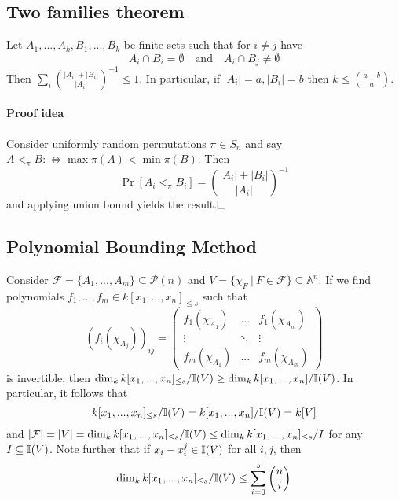\subsection{Two families theorem}
Let $A_1, ..., A_k, B_1, ..., B_k$ be finite sets such that for $i \neq j$ have
\begin{equation*}
    A_i \cap B_i = \emptyset \quad \text{and} \quad A_i \cap B_j \neq \emptyset
\end{equation*}
Then $\sum_i {|A_i| + |B_i| \choose |A_i|}^{-1} \leq 1$. In particular, if $|A_i| = a, |B_i| = b$ then $k \leq {a + b \choose a}$.
\paragraph{Proof idea} Consider uniformly random permutations $\pi \in S_n$ and say $A <_\pi B :\Leftrightarrow \max \pi(A) < \min \pi(B)$.
Then
\begin{equation*}
    \Pr[A_i <_\pi B_i] = {|A_i| + |B_i| \choose |A_i|}^{-1}
\end{equation*}
and applying union bound yields the result.$\hfill\square$

\subsection{Polynomial Bounding Method}
\label{polynomial_bounding_method}
Consider $\mathcal{F} = \{ A_1, ..., A_m \} \subseteq \mathcal{P}(n)$ and $V = \{ \chi_F \ | \ F \in \mathcal{F} \} \subseteq \mathbb{A}^n$.
If we find polynomials $f_1, ..., f_m \in k[x_1, ..., x_n]_{\leq s}$ such that
\begin{equation*}
    (f_i(\chi_{A_j}))_{ij} = \left(\begin{matrix*}
        f_1(\chi_{A_1}) & ... & f_1(\chi_{A_m}) \\
        \vdots & \ddots & \vdots \\
        f_m(\chi_{A_1}) & ... & f_m(\chi_{A_m})
    \end{matrix*}\right)
\end{equation*}
is invertible, then $\dim_k k[x_1, ..., x_n]_{\leq s} / \mathbb{I}(V) \geq \dim_k k[x_1, ..., x_n] / \mathbb{I}(V)$.
In particular, it follows that 
\begin{equation*}
    k[x_1, ..., x_n]_{\leq s} / \mathbb{I}(V) = k[x_1, ..., x_n] / \mathbb{I}(V) = k[V]
\end{equation*}
and $|\mathcal{F}| = |V| = \dim_k k[x_1, ..., x_n]_{\leq s} / \mathbb{I}(V) \leq \dim_k k[x_1, ..., x_n]_{\leq s} / I$ for any $I \subseteq \mathbb{I}(V)$.
Note further that if $x_i - x_i^j \in \mathbb{I}(V)$ for all $i, j$, then
\begin{equation*}
    \dim_k k[x_1, ..., x_n]_{\leq s} / \mathbb{I}(V) \leq \sum_{i = 0}^s {n \choose i}
\end{equation*}

